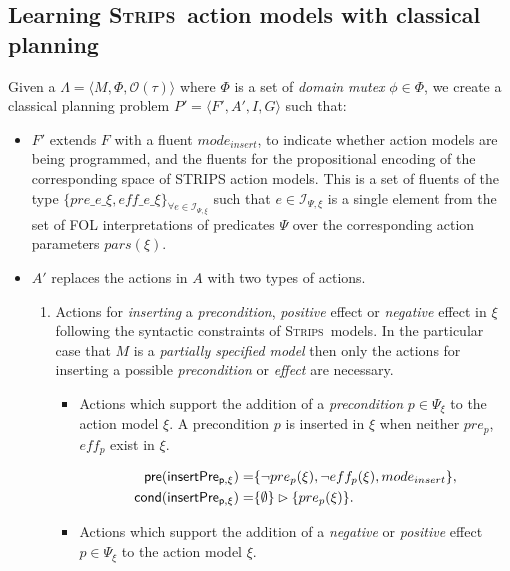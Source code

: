 \documentclass{article}
\newcommand{\tup}[1]{{\langle #1 \rangle}}
\newcommand{\pre}{\mathsf{pre}}     %
\newcommand{\cond}{\mathsf{cond}}   %
\newcommand{\strips}{\textsc{Strips}}
\begin{document}
\subsection{Learning \strips\ action models with classical planning}
Given a $\Lambda=\tup{M,\Phi,\mathcal{O}(\tau)}$ where $\Phi$ is a set of {\em domain mutex} $\phi\in\Phi$, we create a classical planning problem $P'=\tup{F',A',I,G}$ such that:
\begin{itemize}
\item $F'$ extends $F$ with a fluent $mode_{insert}$, to indicate whether action models are being programmed, and the fluents for the propositional encoding of the corresponding space of STRIPS action models. This is a set of fluents of the type $\{pre\_e\_\xi, eff\_e\_\xi\}_{\forall e\in{\mathcal I}_{\Psi,\xi}}$ such that $e\in{\mathcal I}_{\Psi,\xi}$ is a single element from the set of FOL interpretations of predicates $\Psi$ over the corresponding action parameters $pars(\xi)$. 

\item $A'$ replaces the actions in $A$ with two types of actions.
\begin{enumerate}
\item Actions for {\em inserting} a {\em precondition}, {\em positive} effect or {\em negative} effect in $\xi$ following the syntactic constraints of \strips\ models. In the particular case that $M$ is a {\em partially specified model} then only the actions for inserting a possible {\em precondition} or {\em effect} are necessary.
\begin{itemize}
\item Actions which support the addition of a {\em precondition} $p\in \Psi_{\xi}$ to the action model $\xi$. A precondition $p$ is inserted in $\xi$ when neither $pre_p$, $eff_p$ exist in $\xi$.

\begin{small}
\begin{align*}
\hspace*{7pt}\pre(\mathsf{insertPre_{p,\xi}})=&\{\neg pre_{p}(\xi), \neg eff_{p}(\xi), mode_{insert}\},\\
\cond(\mathsf{insertPre_{p,\xi}})=&\{\emptyset\}\rhd\{pre_{p}(\xi)\}.
\end{align*}
\end{small}

\item Actions which support the addition of a {\em negative} or {\em positive} effect $p\in \Psi_{\xi}$ to the action model $\xi$. 


\end{itemize}
\end{enumerate}
\end{itemize}
\end{document}

